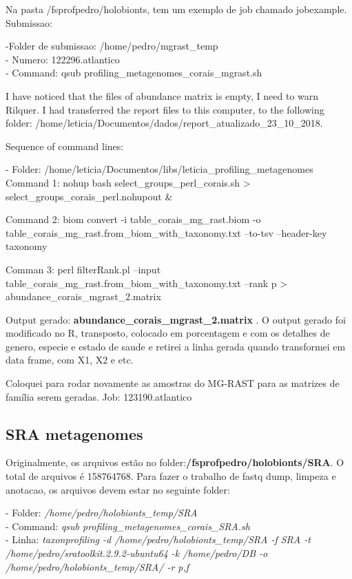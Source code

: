 \documentclass[12pt, a4paper]{report}
\begin{document}
Na pasta /fsprofpedro/holobionts, tem um exemplo de job chamado jobexample. Submissao:
\begin{tcolorbox}
-Folder de submissao: /home/pedro/mgrast\_temp \\
- Numero: 122296.atlantico\\
- Command: qsub profiling\_metagenomes\_corais\_mgrast.sh
\end{tcolorbox}

I have noticed that the files of abundance matrix is empty, I need to warn Rilquer. I had transferred the report files to this computer, to the following folder: /home/leticia/Documentos/dados/report\_atualizado\_23\_10\_2018.

Sequence of command lines:


\begin{tcolorbox}[width=6.7in]
- Folder: /home/leticia/Documentos/libs/leticia\_profiling\_metagenomes \\
Command 1: nohup  bash select\_groups\_perl\_corais.sh > select\_groups\_corais\_perl.nohupout \&

Command 2: biom convert -i table\_corais\_mg\_rast.biom -o table\_corais\_mg\_rast.from\_biom\_with\_taxonomy.txt --to-tsv --header-key taxonomy

Comman 3: perl filterRank.pl --input table\_corais\_mg\_rast.from\_biom\_with\_taxonomy.txt --rank p > abundance\_corais\_mgrast\_2.matrix
\end{tcolorbox}

Output gerado: \textbf{abundance\_corais\_mgrast\_2.matrix} . O output gerado foi modificado no R, transposto, colocado em porcentagem e com os detalhes de genero, especie e estado de saude e retirei a linha gerada quando transformei em data frame, com X1, X2 e etc. 

Coloquei para rodar novamente as amostras do MG-RAST para as matrizes de família serem geradas. Job: 123190.atlantico

\subsection{SRA metagenomes}
Originalmente, os arquivos estão no folder:\textbf {/fsprofpedro/holobionts/SRA}. O total de arquivos é 158764768. Para fazer o trabalho de fastq dump, limpeza e anotacao, os arquivos devem estar no seguinte folder:

\begin{tcolorbox}[width=6.3in]
- Folder: \textit{/home/pedro/holobionts\_temp/SRA} \\
- Command: \textit{qsub profiling\_metagenomes\_corais\_SRA.sh}\\
- Linha: \textit{taxonprofiling -d /home/pedro/holobionts\_temp/SRA -f SRA -t /home/pedro/sratoolkit.2.9.2-ubuntu64 -k /home/pedro/DB -o /home/pedro/holobionts\_temp/SRA/ -r p,f}
\end{tcolorbox}
\end{document}
